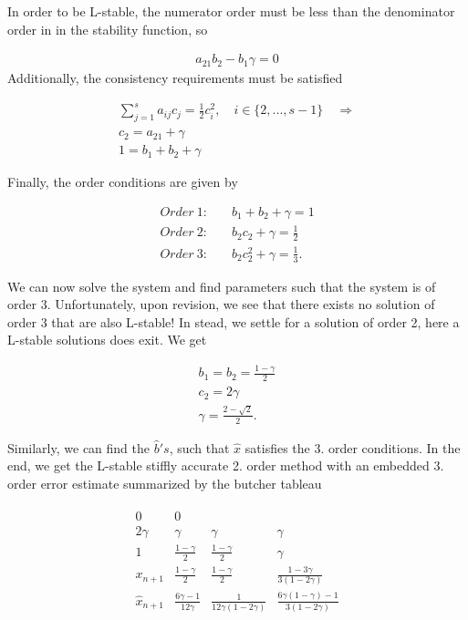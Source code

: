 In order to be L-stable, the numerator order must be less than the denominator order in in the stability function, so

\begin{align}
    a_{21} b_{2}-b_{1} \gamma = 0
\end{align}
Additionally, the consistency requirements must be satisfied 

\begin{align}
    \sum_{j=1}^s a_{ij} c_j = \frac{1}{2}c_i^2, \quad i \in \{2,...,s-1\} \quad \Rightarrow \\
    c_2 = a_{21} + \gamma \\
    1 = b_1 + b_2 + \gamma 
\end{align}

Finally, the order conditions are given by

\begin{align}
    Order \ 1: \quad & b_1 + b_2 + \gamma = 1 \\
    Order \ 2: \quad & b_2 c_2 + \gamma = \frac{1}{2} \\
    Order \ 3: \quad & b_2 c_2^2 + \gamma = \frac{1}{3}.
\end{align}

We can now solve the system and find parameters such that the system is of order 3. Unfortunately, upon revision, we see that there exists no solution of order 3 that are also L-stable! In stead, we settle for a solution of order 2, here a L-stable solutions does exit. We get

\begin{align}
    b_1 = b_2 = \frac{1- \gamma}{2} \\
    c_2 = 2 \gamma \\
    \gamma = \frac{2- \sqrt{2}}{2}.
\end{align}

Similarly, we can find the $\hat b's$, such that $\hat x$ satisfies the 3. order conditions. In the end, we get the L-stable stiffly accurate 2. order method with an embedded 3. order error estimate summarized by the butcher tableau 

\begin{align}
    \begin{array}{c|ccc}
0 & 0 & & \\
2 \gamma & \gamma & \gamma & \gamma \\
1 & \frac{1-\gamma}{2} & \frac{1-\gamma}{2} & \gamma \\
\hline x_{n+1} & \frac{1-\gamma}{2} & \frac{1-\gamma}{2} & \frac{1-3 \gamma}{3(1-2 \gamma)} \\
\hat{x}_{n+1} & \frac{6 \gamma-1}{12 \gamma} & \frac{1}{12 \gamma(1-2 \gamma)} & \frac{6 \gamma(1-\gamma)-1}{3(1-2 \gamma)}
\end{array}
\end{align}

